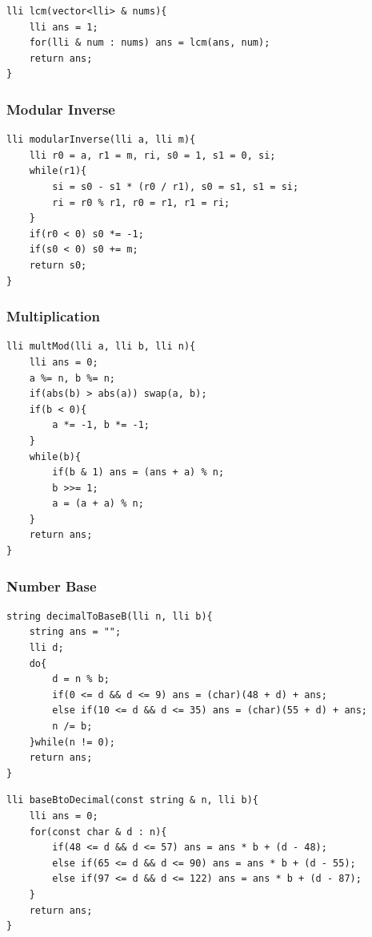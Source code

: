 \documentclass[twoside]{article}
\begin{document}
\begin{multicols*}{2}
\begin{verbatim}
\end{verbatim}
\vspace{-12pt}
\begin{verbatim}
lli lcm(vector<lli> & nums){
	lli ans = 1;
	for(lli & num : nums) ans = lcm(ans, num);
	return ans;
}

\end{verbatim}

\subsubsectionfont{\large\bfseries\sffamily\underline}
\subsubsection*{Modular Inverse}
\begin{verbatim}
lli modularInverse(lli a, lli m){
	lli r0 = a, r1 = m, ri, s0 = 1, s1 = 0, si;
	while(r1){
		si = s0 - s1 * (r0 / r1), s0 = s1, s1 = si;
		ri = r0 % r1, r0 = r1, r1 = ri;
	}
	if(r0 < 0) s0 *= -1;
	if(s0 < 0) s0 += m;
	return s0;
}

\end{verbatim}

\subsubsectionfont{\large\bfseries\sffamily\underline}
\subsubsection*{Multiplication}
\begin{verbatim}
lli multMod(lli a, lli b, lli n){
	lli ans = 0;
	a %= n, b %= n;
	if(abs(b) > abs(a)) swap(a, b);
	if(b < 0){
		a *= -1, b *= -1;
	}
	while(b){
		if(b & 1) ans = (ans + a) % n;
		b >>= 1;
		a = (a + a) % n;
	}
	return ans;
}

\end{verbatim}

\subsubsectionfont{\large\bfseries\sffamily\underline}
\subsubsection*{Number Base}
\begin{verbatim}
string decimalToBaseB(lli n, lli b){
	string ans = "";
	lli d;
	do{
		d = n % b;
		if(0 <= d && d <= 9) ans = (char)(48 + d) + ans;
		else if(10 <= d && d <= 35) ans = (char)(55 + d) + ans;
		n /= b;
	}while(n != 0);
	return ans;
}

\end{verbatim}
\vspace{-12pt}
\begin{verbatim}
lli baseBtoDecimal(const string & n, lli b){
	lli ans = 0;
	for(const char & d : n){
		if(48 <= d && d <= 57) ans = ans * b + (d - 48);
		else if(65 <= d && d <= 90) ans = ans * b + (d - 55);
		else if(97 <= d && d <= 122) ans = ans * b + (d - 87);
	}
	return ans;
}


\end{verbatim}
\end{multicols*}
\end{document}
